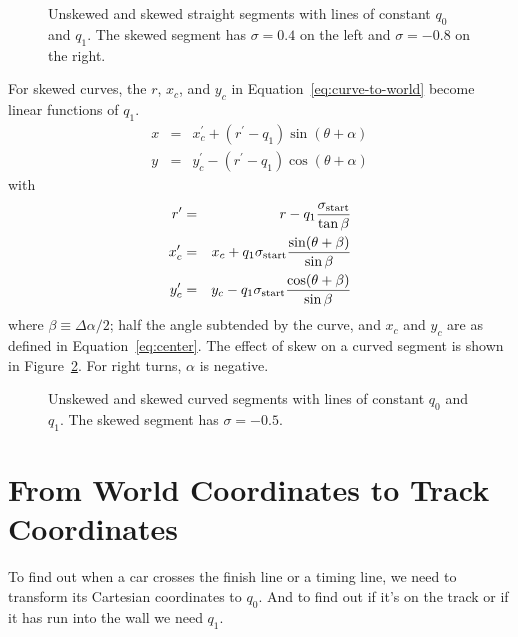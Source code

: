 \documentclass{article}
\newcommand{\skewstart}{%
  \ensuremath{\sigma_\mathrm{start}}}
\begin{document}
\begin{figure}
  \centering
  \caption{Unskewed and skewed straight segments with lines of
    constant $q_0$ and $q_1$.  The skewed segment has $\sigma=0.4$ on
    the left and $\sigma=-0.8$ on the right.}
  \label{fig:straight}
\end{figure}

For skewed curves, the $r$, $x_c$, and $y_c$ in
Equation~\ref{eq:curve-to-world} become linear functions of $q_1$.
\begin{eqnarray}
  x & = & x_c^\prime + (r^\prime - q_1) \sin (\theta + \alpha) \\
  y & = & y_c^\prime - (r^\prime - q_1) \cos (\theta + \alpha) \nonumber
\end{eqnarray}
with
\begin{eqnarray}
  \label{eq:curve-primes}
  r^\prime & = & 
  r - q_1 \frac{\skewstart}{\tan\beta} \\
  x_c^\prime & = & 
  x_c + q_1 \skewstart \frac{\sin (\theta + \beta)}{\sin\beta}
  \nonumber \\
  y_c^\prime & = & 
  y_c - q_1 \skewstart \frac{\cos (\theta + \beta)}{\sin\beta}
  \nonumber
\end{eqnarray}
where $\beta \equiv \Delta \alpha / 2$; half the angle subtended by
the curve, and $x_c$ and $y_c$ are as defined in
Equation~\ref{eq:center}.  The effect of skew on a curved segment is
shown in Figure~\ref{fig:curve}.  For right turns, $\alpha$ is
negative.

\begin{figure}
  \centering
  \caption{Unskewed and skewed curved segments with lines of
    constant $q_0$ and $q_1$.  The skewed segment has $\sigma=-0.5$.}
  \label{fig:curve}
\end{figure}

\section{From World Coordinates to Track Coordinates}

To find out when a car crosses the finish line or a timing line, we
need to transform its Cartesian coordinates to $q_0$.  And to find out
if it's on the track or if it has run into the wall we need $q_1$.
\end{document}
